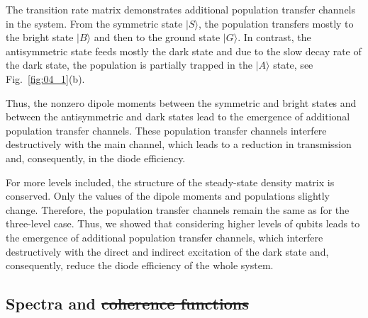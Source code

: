 \documentclass[lettersize,journal]{IEEEtran}
\providecommand{\DIFaddtex}[1]{{\protect\color{blue}\uwave{#1}}} %
\providecommand{\DIFdeltex}[1]{{\protect\color{red}\sout{#1}}}                      %
\providecommand{\DIFaddbegin}{} %
\providecommand{\DIFaddend}{} %
\providecommand{\DIFdelbegin}{} %
\providecommand{\DIFdelend}{} %
\providecommand{\DIFadd}[1]{\texorpdfstring{\DIFaddtex{#1}}{#1}} %
\providecommand{\DIFdel}[1]{\texorpdfstring{\DIFdeltex{#1}}{}} %
\newcommand{\DIFscaledelfig}{0.5}
\newlength{\DIFdelgraphicswidth} %
\newlength{\DIFdelgraphicsheight} %
\newcommand{\DIFaddincludegraphics}[2][]{{\color{blue}\fbox{\DIFOincludegraphics[#1]{#2}}}} %
\newcommand{\DIFdelincludegraphics}[2][]{%
\sbox{\DIFdelgraphicsbox}{\DIFOincludegraphics[#1]{#2}}%
\settoboxwidth{\DIFdelgraphicswidth}{\DIFdelgraphicsbox} %
\settoboxtotalheight{\DIFdelgraphicsheight}{\DIFdelgraphicsbox} %
\scalebox{\DIFscaledelfig}{%
\parbox[b]{\DIFdelgraphicswidth}{\usebox{\DIFdelgraphicsbox}\\[-\baselineskip] \rule{\DIFdelgraphicswidth}{0em}}\llap{\resizebox{\DIFdelgraphicswidth}{\DIFdelgraphicsheight}{%
\setlength{\unitlength}{\DIFdelgraphicswidth}%
\begin{picture}(1,1)%
\thicklines\linethickness{2pt} %
{\color[rgb]{1,0,0}\put(0,0){\framebox(1,1){}}}%
{\color[rgb]{1,0,0}\put(0,0){\line( 1,1){1}}}%
{\color[rgb]{1,0,0}\put(0,1){\line(1,-1){1}}}%
\end{picture}%
}\hspace*{3pt}}} %
} %
\DeclareRobustCommand{\DIFaddbegin}{\DIFOaddbegin \let\includegraphics\DIFaddincludegraphics} %
\DeclareRobustCommand{\DIFaddend}{\DIFOaddend \let\includegraphics\DIFOincludegraphics} %
\DeclareRobustCommand{\DIFdelbegin}{\DIFOdelbegin \let\includegraphics\DIFdelincludegraphics} %
\DeclareRobustCommand{\DIFdelend}{\DIFOaddend \let\includegraphics\DIFOincludegraphics} %
\begin{document}
The transition rate matrix demonstrates additional population transfer channels in the system.
From the symmetric state $|S\rangle$, the population transfers mostly to the bright state $|B\rangle$ and then to the ground state $|G\rangle$.
In contrast, the antisymmetric state feeds mostly the dark state and due to the slow decay rate of the dark state, the population is partially trapped in the $|A\rangle$ state, see Fig.~\ref{fig:04_1}(b).

Thus, the nonzero dipole moments between the symmetric and bright states and between the antisymmetric and dark states lead to the emergence of additional population transfer channels.
These population transfer channels interfere destructively with the main channel, which leads to a reduction in transmission and, consequently, in the diode efficiency.

For more levels included, the structure of the steady-state density matrix is conserved.
Only the values of the dipole moments and populations slightly change.
Therefore, the population transfer channels remain the same as for the three-level case.
Thus, we showed that considering higher levels of qubits leads to the emergence of additional population transfer channels, which interfere destructively with the direct and indirect excitation of the dark state and, consequently, reduce the diode efficiency of the whole system.

\subsection{Spectra and \DIFdelbegin \DIFdel{coherence functions}\DIFdelend \DIFaddbegin \DIFadd{Coherence Functions}\DIFaddend }
\end{document}
